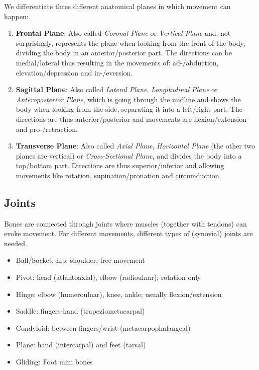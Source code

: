 We differentiate three different anatomical planes in which movement can happen:

\begin{enumerate}
    \setlength\itemsep{0em}
    \item \textbf{Frontal Plane}: Also called \textit{Coronal Plane} or \textit{Vertical Plane} and, not surprisingly, represents the plane when looking from the front of the body, dividing the body in an anterior/posterior part.
    The directions can be medial/lateral thus resulting in the movements of: ad-/abduction, elevation/depression and in-/eversion.
    \item \textbf{Sagittal Plane}: Also called \textit{Lateral Plane}, \textit{Longitudinal Plane} or \textit{Anteroposterior Plane}, which is going through the midline and shows the body when looking from the side, separating it into a left/right part.
    The directions are thus anterior/posterior and movements are flexion/extension and pro-/retraction.
    \item \textbf{Transverse Plane}: Also called \textit{Axial Plane}, \textit{Horizontal Plane} (the other two planes are vertical) or \textit{Cross-Sectional Plane}, and divides the body into a top/bottom part.
    Directions are thus superior/inferior and allowing movements like rotation, supination/pronation and circumduction.
\end{enumerate}


\subsection{Joints}\label{subsec:joints}

Bones are connected through joints where muscles (together with tendons) can evoke movement.
For different movements, different types of (synovial) joints are needed.

\begin{itemize}
    \setlength\itemsep{0em}
    \item Ball/Socket: hip, shoulder; free movement
    \item Pivot: head (atlantoaxial), elbow (radioulnar); rotation only
    \item Hinge: elbow (humeroulnar), knee, ankle; usually flexion/extension
    \item Saddle: fingers-hand (trapeziometacarpal)
    \item Condyloid: between fingers/wrist (metacarpophalangeal)
    \item Plane: hand (intercarpal) and feet (tarsal)
    \item Gliding: Foot mini bones
\end{itemize}
